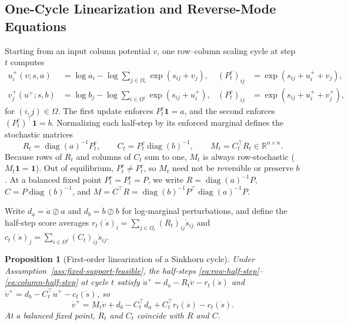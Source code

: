 \documentclass[10pt]{article}
\newtheorem{proposition}{Proposition}
\newcommand{\one}{\mathbf{1}}
\DeclareMathOperator{\diag}{diag}
\begin{document}
\subsection{One-Cycle Linearization and Reverse-Mode Equations}

Starting from an input column potential $v$, one row--column scaling cycle at step $t$ computes
\begin{align}
  u_i^+(v; s, a) &= \log a_i - \log \sum_{j \in \Omega_i} \exp(s_{ij} + v_j),
  & (P_t^r)_{ij} &= \exp(s_{ij} + u_i^+ + v_j), \label{eq:row-half-step}\\
  v_j^+(u^+; s, b) &= \log b_j - \log \sum_{i \in \Omega^j} \exp(s_{ij} + u_i^+),
  & (P_t^c)_{ij} &= \exp(s_{ij} + u_i^+ + v_j^+), \label{eq:column-half-step}
\end{align}
for $(i,j)\in\Omega$. The first update enforces $P_t^r\one = a$, and the second enforces $(P_t^c)^\top\one = b$. Normalizing each half-step by its enforced marginal defines the stochastic matrices
\[
  R_t = \diag(a)^{-1} P_t^r,
  \qquad
  C_t = P_t^c \diag(b)^{-1},
  \qquad
  M_t = C_t^\top R_t \in \mathbb{R}^{n\times n}.
\]
Because rows of $R_t$ and columns of $C_t$ sum to one, $M_t$ is always row-stochastic ($M_t\one = \one$). Out of equilibrium, $P_t^r \neq P_t^c$, so $M_t$ need not be reversible or preserve $b$. At a balanced fixed point $P_t^r = P_t^c = P$, we write $R = \diag(a)^{-1}P$, $C = P\diag(b)^{-1}$, and $M = C^\top R = \diag(b)^{-1}P^\top \diag(a)^{-1}P$.

Write $d_a = \dot a \oslash a$ and $d_b = \dot b \oslash b$ for log-marginal perturbations, and define the half-step score averages $r_t(\dot s)_i = \sum_{j\in\Omega_i} (R_t)_{ij}\dot s_{ij}$ and $c_t(\dot s)_j = \sum_{i\in\Omega^j} (C_t)_{ij}\dot s_{ij}$.

\begin{proposition}[First-order linearization of a Sinkhorn cycle]
\label{prop:half-step-linearization}
Under Assumption~\ref{ass:fixed-support-feasible}, the half-steps \eqref{eq:row-half-step}--\eqref{eq:column-half-step} at cycle $t$ satisfy $\dot u^+ = d_a - R_t \dot v - r_t(\dot s)$ and $\dot v^+ = d_b - C_t^\top \dot u^+ - c_t(\dot s)$, so
\begin{equation}
\label{eq:full-linearization-with-sources}
  \dot v^+ = M_t \dot v + d_b - C_t^\top d_a + C_t^\top r_t(\dot s) - c_t(\dot s).
\end{equation}
At a balanced fixed point, $R_t$ and $C_t$ coincide with $R$ and $C$.
\end{proposition}
\end{document}
